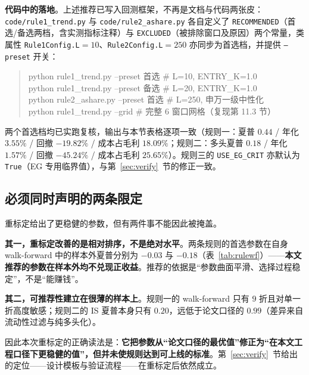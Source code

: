\textbf{代码中的落地}。上述推荐已写入回测框架，不再是文档与代码两张皮：\texttt{code/rule1\_trend.py} 与 \texttt{code/rule2\_ashare.py} 各自定义了 \texttt{RECOMMENDED}（首选/备选两档，含实测指标注释）与 \texttt{EXCLUDED}（被排除窗口及原因）两个常量，类属性 \texttt{Rule1Config.L}$=10$、\texttt{Rule2Config.L}$=250$ 亦同步为首选档，并提供 \texttt{--preset} 开关：

\begin{quote}\ttfamily\small
python rule1\_trend.py --preset 首选 \hfill \# L=10, ENTRY\_K=1.0\\
python rule1\_trend.py --preset 备选 \hfill \# L=20, ENTRY\_K=1.0\\
python rule2\_ashare.py --preset 首选 \hfill \# L=250, 申万一级中性化\\
python rule1\_trend.py --grid \hfill \# 完整 6 窗口网格（复现第 11.3 节）
\end{quote}

两个首选档均已实跑复核，输出与本节表格逐项一致（规则一：夏普 $0.44$ / 年化 $3.55\%$ / 回撤 $-19.82\%$ / 成本占毛利 $18.09\%$；规则二：多头夏普 $0.18$ / 年化 $1.57\%$ / 回撤 $-45.24\%$ / 成本占毛利 $25.65\%$）。规则三的 \texttt{USE\_EG\_CRIT} 亦默认为 \texttt{True}（EG 专用临界值），与第~\ref{sec:verify}~节的修正一致。

\subsection{必须同时声明的两条限定}

重标定给出了更稳健的参数，但有两件事不能因此被掩盖。

\textbf{其一，重标定改善的是相对排序，不是绝对水平}。两条规则的首选参数在自身 walk-forward 中的样本外夏普分别为 $-0.03$ 与 $-0.18$（表~\ref{tab:rulewf}）——\textbf{本文推荐的参数在样本外均不兑现正收益}。推荐的依据是“参数曲面平滑、选择过程稳定”，不是“能赚钱”。

\textbf{其二，可推荐性建立在很薄的样本上}。规则一的 walk-forward 只有 $9$ 折且对单一折高度敏感；规则二的 IS 夏普本身只有 $0.20$，远低于论文口径的 $0.99$（差异来自流动性过滤与纯多头化）。

因此本次重标定的正确读法是：\textbf{它把参数从“论文口径的最优值”修正为“在本文工程口径下更稳健的值”，但并未使规则达到可上线的标准}。第~\ref{sec:verify}~节给出的定位——设计模板与验证流程——在重标定后依然成立。
